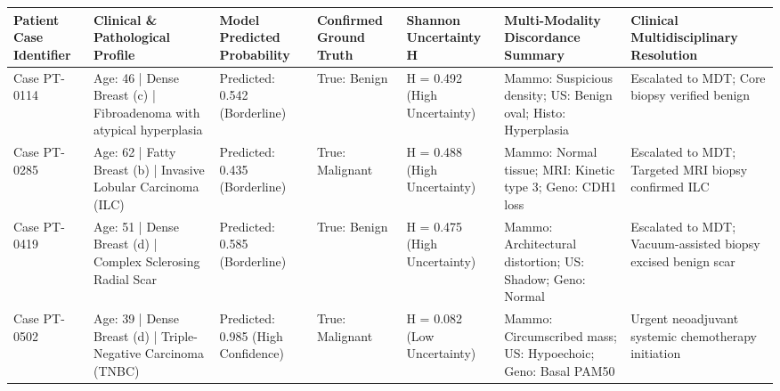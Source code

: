 \begin{tabular}{lllllll}
\toprule
Patient Case Identifier & Clinical \& Pathological Profile & Model Predicted Probability & Confirmed Ground Truth & Shannon Uncertainty H & Multi-Modality Discordance Summary & Clinical Multidisciplinary Resolution \\
\midrule
Case PT-0114 & Age: 46 | Dense Breast (c) | Fibroadenoma with atypical hyperplasia & Predicted: 0.542 (Borderline) & True: Benign & H = 0.492 (High Uncertainty) & Mammo: Suspicious density; US: Benign oval; Histo: Hyperplasia & Escalated to MDT; Core biopsy verified benign \\
Case PT-0285 & Age: 62 | Fatty Breast (b) | Invasive Lobular Carcinoma (ILC) & Predicted: 0.435 (Borderline) & True: Malignant & H = 0.488 (High Uncertainty) & Mammo: Normal tissue; MRI: Kinetic type 3; Geno: CDH1 loss & Escalated to MDT; Targeted MRI biopsy confirmed ILC \\
Case PT-0419 & Age: 51 | Dense Breast (d) | Complex Sclerosing Radial Scar & Predicted: 0.585 (Borderline) & True: Benign & H = 0.475 (High Uncertainty) & Mammo: Architectural distortion; US: Shadow; Geno: Normal & Escalated to MDT; Vacuum-assisted biopsy excised benign scar \\
Case PT-0502 & Age: 39 | Dense Breast (d) | Triple-Negative Carcinoma (TNBC) & Predicted: 0.985 (High Confidence) & True: Malignant & H = 0.082 (Low Uncertainty) & Mammo: Circumscribed mass; US: Hypoechoic; Geno: Basal PAM50 & Urgent neoadjuvant systemic chemotherapy initiation \\
\bottomrule
\end{tabular}
